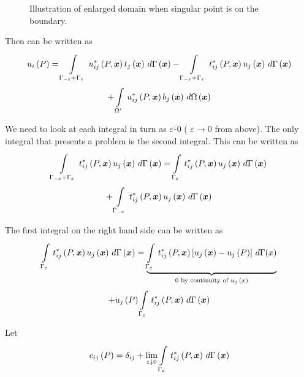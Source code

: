 \begin{figure}[htbp] \centering
  
  \caption{Illustration of enlarged domain when singular point is on the 
    boundary.}
\end{figure}
Then  can be written as
\begin{multline}
   u_{i}\left( P \right)  =   \displaystyle\int\limits_{\Gamma_{-\varepsilon} +\Gamma_{\varepsilon}}^{} \, u_{ij}^{*}\left( P,\boldsymbol{x} \right) 
     t_{j}\left( \boldsymbol{x} \right) \,d \Gamma\left( \boldsymbol{x} \right)   -
    \displaystyle\int\limits_{\Gamma_{-\varepsilon}+
    \Gamma_{\varepsilon}}^{} \, t_{ij}^{*}\left( P,\boldsymbol{x} \right) 
     u_{j}\left( \boldsymbol{x} \right) \,d \Gamma\left( \boldsymbol{x} \right)   \\ +
      \displaystyle\int\limits_{\Omega^{\prime}}^{} \, u_{ij}^*\left( P,\boldsymbol{x} \right)   b_{j}\left( \boldsymbol{x} \right) \,d \Omega\left( \boldsymbol{x} \right)   
  \label{eqn:Fwrit}
\end{multline} 

We need to look at each integral in turn as $\varepsilon^{\downarrow}0$ (\ie
$\varepsilon \rightarrow 0$ from above).  The only integral that presents a
problem is the second integral. This can be written as
\begin{multline}
    \displaystyle\int\limits_{\Gamma_{-\varepsilon}+\Gamma_{\varepsilon}}^{} \, t_{ij}^{*}\left( P,\boldsymbol{x} \right)   u_{j}\left( \boldsymbol{x} \right) \,d \Gamma\left( \boldsymbol{x} \right)   =
    \displaystyle\int\limits_{\Gamma_{\varepsilon}}^{} \, t_{ij}^{*}\left( P,\boldsymbol{x} \right) 
     u_{j}\left( \boldsymbol{x} \right) \,d \Gamma\left( \boldsymbol{x} \right)   \\ +
    \displaystyle\int\limits_{\Gamma_{-\varepsilon}}^{} \, t_{ij}^{*}\left( P,\boldsymbol{x} \right) 
     u_{j}\left( \boldsymbol{x} \right) \,d \Gamma\left( \boldsymbol{x} \right)  
  \label{eqn:2ndint}
\end{multline} 

The first integral on the right hand side can be written as
\begin{multline}
    \displaystyle\int\limits_{\Gamma_{\varepsilon}}^{} \, t_{ij}^{*}\left( P,\boldsymbol{x} \right) 
     u_{j}\left( \boldsymbol{x} \right) \,d \Gamma\left( \boldsymbol{x} \right)   =
  \underbrace{  \displaystyle\int\limits_{\Gamma_{\varepsilon}}^{} \, t_{ij}^{*}\left( P,\boldsymbol{x} \right) 
      \left[  u_{j}\left( \boldsymbol{x} \right) - u_{j}\left( P \right)  \right]\,d\Gamma(x) }_{\text{$0$
      by continuity of $ u_{j}\left( x \right) $}} \\ +  u_{j}\left( P \right) 
    \displaystyle\int\limits_{\Gamma_{\varepsilon}}^{} \, t_{ij}^{*}\left( P,\boldsymbol{x} \right) \,d \Gamma\left( \boldsymbol{x} \right)  
\label{eqn:1stint}
\end{multline}  
  
Let
\begin{equation}
   c_{ij}\left( P \right)  = \delta_{ij} + \lim_{\varepsilon \downarrow 0}
     \displaystyle\int\limits_{\Gamma_{\varepsilon}}^{} \, t_{ij}^{*}\left( P,\boldsymbol{x} \right) \,d \Gamma\left( \boldsymbol{x} \right)  
 \label{eqn:eqnG}
\end{equation}

